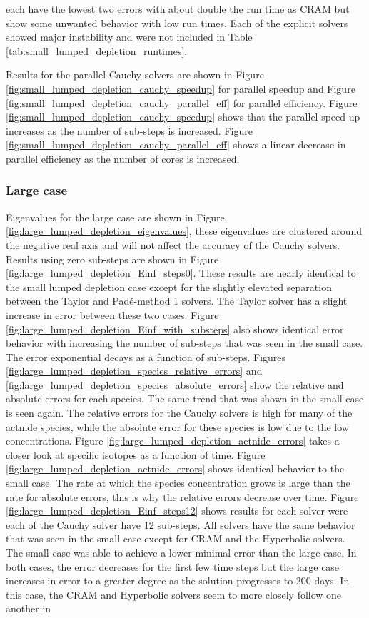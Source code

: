 \clearpage

\noindent each have the lowest two errors with about double the run time as CRAM but show some unwanted behavior with low run times.  Each of the explicit solvers showed major instability and were not included in Table \ref{tab:small_lumped_depletion_runtimes}. 

Results for the parallel Cauchy solvers are shown in Figure \ref{fig:small_lumped_depletion_cauchy_speedup} for parallel speedup and Figure \ref{fig:small_lumped_depletion_cauchy_parallel_eff} for parallel efficiency. Figure \ref{fig:small_lumped_depletion_cauchy_speedup} shows that the parallel speed up increases as the number of sub-steps is increased. Figure \ref{fig:small_lumped_depletion_cauchy_parallel_eff} shows a linear decrease in parallel efficiency as the number of cores is increased. 




\subsubsection{Large case}
Eigenvalues for the large case are shown in Figure \ref{fig:large_lumped_depletion_eigenvalues}, these eigenvalues are clustered around the negative real axis and will not affect the accuracy of the Cauchy solvers. Results using zero sub-steps are shown in Figure \ref{fig:large_lumped_depletion_Einf_steps0}. These results are nearly identical to the small lumped depletion case except for the slightly elevated separation between the Taylor and Pad\'e-method 1 solvers. The Taylor solver has a slight increase in error between these two cases. Figure \ref{fig:large_lumped_depletion_Einf_with_substeps} also shows identical error behavior with increasing the number of sub-steps that was seen in the small case. The error exponential decays as a function of sub-steps. Figures \ref{fig:large_lumped_depletion_species_relative_errors} and \ref{fig:large_lumped_depletion_species_absolute_errors} show the relative and absolute errors for each species. The same trend that was shown in the small case is seen again. The relative errors for the Cauchy solvers is high for many of the actnide species, while the absolute error for these species is low due to the low concentrations. Figure \ref{fig:large_lumped_depletion_actnide_errors} takes a closer look at specific isotopes as a function of time. Figure \ref{fig:large_lumped_depletion_actnide_errors} shows identical behavior to the small case. The rate at which the species concentration grows is large than the rate for absolute errors, this is why the relative errors decrease over time. Figure \ref{fig:large_lumped_depletion_Einf_steps12} shows results for each solver were each of the Cauchy solver have 12 sub-steps. All solvers have the same behavior that was seen in the small case except for CRAM and the Hyperbolic solvers. The small case was able to achieve a lower minimal error than the large case. In both cases, the error decreases for the first few time steps but the large case increases in error to a greater degree as the solution progresses to 200 days. In this case, the CRAM and Hyperbolic solvers seem to more closely follow one another in 


